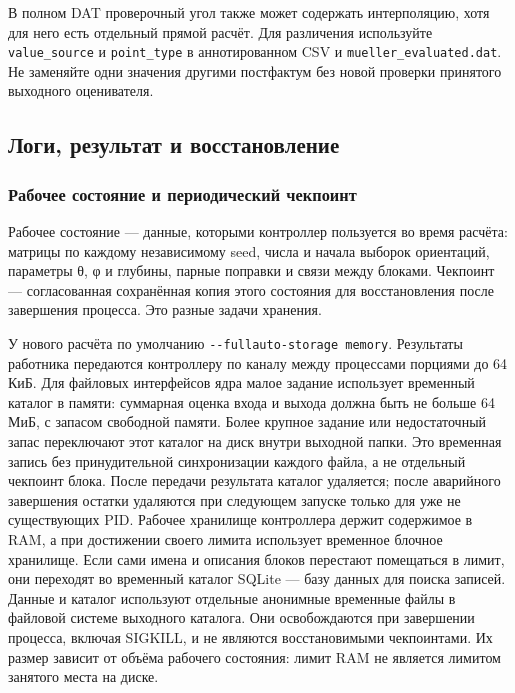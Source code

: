 В полном DAT проверочный угол также может содержать интерполяцию, хотя
для него есть отдельный прямой расчёт. Для различения используйте
\nolinkurl{value_source} и \nolinkurl{point_type} в аннотированном CSV и
\nolinkurl{mueller_evaluated.dat}. Не заменяйте одни значения другими
постфактум без новой проверки принятого выходного оценивателя.

\subsection{Логи, результат и
восстановление}\label{ux43bux43eux433ux438-ux440ux435ux437ux443ux43bux44cux442ux430ux442-ux438-ux432ux43eux441ux441ux442ux430ux43dux43eux432ux43bux435ux43dux438ux435}

\subsubsection{Рабочее состояние и периодический
чекпоинт}\label{ux440ux430ux431ux43eux447ux435ux435-ux441ux43eux441ux442ux43eux44fux43dux438ux435-ux438-ux43fux435ux440ux438ux43eux434ux438ux447ux435ux441ux43aux438ux439-ux447ux435ux43aux43fux43eux438ux43dux442}

Рабочее состояние --- данные, которыми контроллер пользуется во время
расчёта: матрицы по каждому независимому seed, числа и начала выборок
ориентаций, параметры θ, φ и глубины, парные поправки и связи между
блоками. Чекпоинт --- согласованная сохранённая копия этого состояния
для восстановления после завершения процесса. Это разные задачи
хранения.

У нового расчёта по умолчанию \texttt{-\/-fullauto-storage\ memory}.
Результаты работника передаются контроллеру по каналу между процессами
порциями до 64 КиБ. Для файловых интерфейсов ядра малое задание
использует временный каталог в памяти: суммарная оценка входа и выхода
должна быть не больше 64 МиБ, с запасом свободной памяти. Более крупное
задание или недостаточный запас переключают этот каталог на диск внутри
выходной папки. Это временная запись без принудительной синхронизации
каждого файла, а не отдельный чекпоинт блока. После передачи результата
каталог удаляется; после аварийного завершения остатки удаляются при
следующем запуске только для уже не существующих PID. Рабочее хранилище
контроллера держит содержимое в RAM, а при достижении своего лимита
использует временное блочное хранилище. Если сами имена и описания
блоков перестают помещаться в лимит, они переходят во временный каталог
SQLite --- базу данных для поиска записей. Данные и каталог используют
отдельные анонимные временные файлы в файловой системе выходного
каталога. Они освобождаются при завершении процесса, включая SIGKILL, и
не являются восстановимыми чекпоинтами. Их размер зависит от объёма
рабочего состояния: лимит RAM не является лимитом занятого места на
диске.

